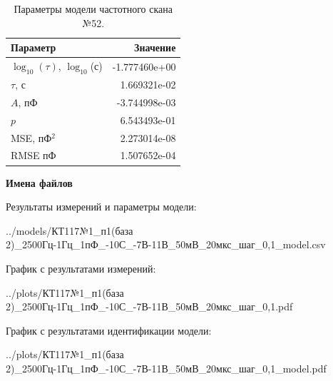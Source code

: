 \begin{table}[!ht]
    \centering
    \caption{Параметры модели частотного скана №52.}
    \begin{tabular}{|l|r|}
        \hline
        Параметр                                       & Значение                  \\ \hline
        $\log_{10}(\tau)$, $\log_{10}$(с)              & -1.777460e+00             \\ \hline
        $\tau$, с                                      & 1.669321e-02              \\ \hline
        $A$, пФ                                        & -3.744998e-03             \\ \hline
        $p$                                            & 6.543493e-01              \\ \hline
        MSE, пФ$^2$                                    & 2.273014e-08              \\ \hline
        RMSE пФ                                        & 1.507652e-04              \\ \hline
    \end{tabular}
    \label{table:frequency_scan_model_52}
\end{table}

\textbf{Имена файлов}

Результаты измерений и параметры модели:

\scriptsize../models/КТ117№1\_п1(база 2)\_2500Гц-1Гц\_1пФ\_-10С\_-7В-11В\_50мВ\_20мкс\_шаг\_0,1\_model.csv
\normalsize

График с результатами измерений:

\scriptsize../plots/КТ117№1\_п1(база 2)\_2500Гц-1Гц\_1пФ\_-10С\_-7В-11В\_50мВ\_20мкс\_шаг\_0,1.pdf
\normalsize

График с результатами идентификации модели:

\scriptsize../plots/КТ117№1\_п1(база 2)\_2500Гц-1Гц\_1пФ\_-10С\_-7В-11В\_50мВ\_20мкс\_шаг\_0,1\_model.pdf
\normalsize

